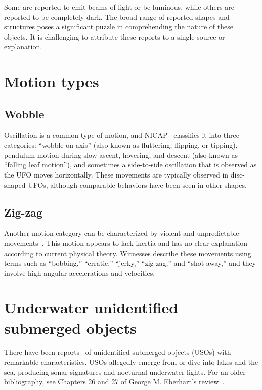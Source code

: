 Some are reported to emit beams of light or be luminous, while others are reported to be completely dark. The broad range of reported shapes and structures poses a significant puzzle in comprehending the nature of these objects. It is challenging to attribute these reports to a single source or explanation.



\section{Motion types}
\label{2023-UFO-part-Perception-flight-characteristics-mt}


\subsection{Wobble}

Oscillation is a common type of motion, and NICAP~\cite[p.~26]{Kocher-RAND-1968Jan} classifies it into three categories: ``wobble on axis'' (also known as fluttering, flipping, or tipping), pendulum motion during slow ascent, hovering, and descent (also known as ``falling leaf motion''), and sometimes a side-to-side oscillation that is observed as the UFO moves horizontally. These movements are typically observed in disc-shaped UFOs, although comparable behaviors have been seen in other shapes.

\subsection{Zig-zag}

Another motion category can be characterized by violent and unpredictable movements~\cite[p.~26]{Kocher-RAND-1968Jan}. This motion appears to lack inertia and has no clear explanation according to current physical theory. Witnesses describe these movements using terms such as ``bobbing,'' ``erratic,'' ``jerky,'' ``zig-zag,'' and ``shot away,'' and they involve high angular accelerations and velocities.

\section{Underwater unidentified submerged objects}

There have been reports~\cite{Sanderson-invisibeRes,DolanDisclosure2023Mar} of unidentified submerged objects (USOs) with remarkable characteristics. USOs allegedly emerge from or dive into lakes and the sea, producing sonar signatures and nocturnal underwater lights. For an older bibliography, see Chapters 26 and 27 of George M. Eberhart's review~\cite{Eberhart-I-1986Jan}.


